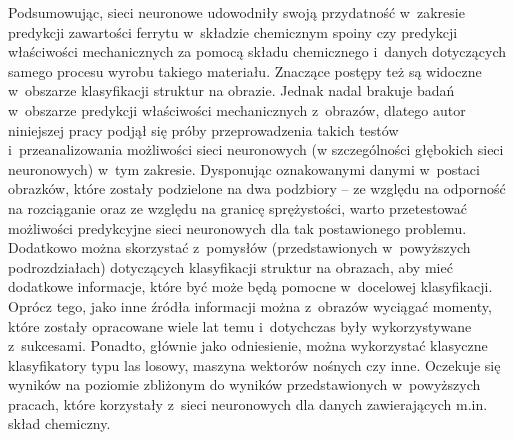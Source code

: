 Podsumowując, sieci neuronowe udowodniły swoją przydatność w~zakresie predykcji zawartości ferrytu w~składzie chemicznym spoiny czy predykcji właściwości mechanicznych za pomocą składu chemicznego i~danych dotyczących samego procesu wyrobu takiego materiału. Znaczące postępy też są widoczne w~obszarze klasyfikacji struktur na obrazie. Jednak nadal brakuje badań w~obszarze predykcji właściwości mechanicznych z~obrazów, dlatego autor niniejszej pracy podjął się próby przeprowadzenia takich testów i~przeanalizowania możliwości sieci neuronowych (w szczególności głębokich sieci neuronowych) w~tym zakresie. Dysponując oznakowanymi danymi w~postaci obrazków, które zostały podzielone na dwa podzbiory –  ze względu na odporność na rozciąganie oraz ze względu na granicę sprężystości, warto przetestować możliwości predykcyjne sieci neuronowych dla tak postawionego problemu. Dodatkowo można skorzystać z~pomysłów (przedstawionych w~powyższych podrozdziałach) dotyczących klasyfikacji struktur na obrazach, aby mieć dodatkowe informacje, które być może będą pomocne w~docelowej klasyfikacji. Oprócz tego, jako inne źródła informacji można z~obrazów wyciągać momenty, które zostały opracowane wiele lat temu i~dotychczas były wykorzystywane z~sukcesami. Ponadto, głównie jako odniesienie, można wykorzystać klasyczne klasyfikatory typu las losowy, maszyna wektorów nośnych czy inne. Oczekuje się wyników na poziomie zbliżonym do wyników przedstawionych w~powyższych pracach, które korzystały z~sieci neuronowych dla danych zawierających m.in. skład chemiczny.  







